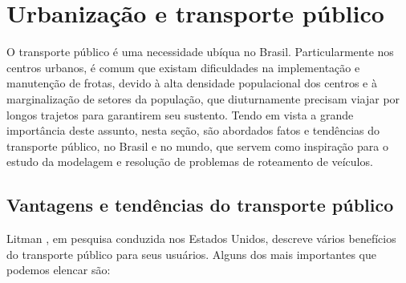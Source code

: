 \section{Urbanização e transporte público}\label{sec:urbanização e transporte público}
O transporte público é uma necessidade ubíqua no Brasil. Particularmente nos centros urbanos, é comum que existam dificuldades na implementação e manutenção de frotas, devido à alta densidade populacional dos centros e à marginalização de setores da população, que diuturnamente precisam viajar por longos trajetos para garantirem seu sustento. Tendo em vista a grande importância deste assunto, nesta seção, são abordados fatos e tendências do transporte público, no Brasil e no mundo, que servem como inspiração para o estudo da modelagem e resolução de problemas de roteamento de veículos.

\subsection{Vantagens e tendências do transporte público}\label{sec:vantagens transporte público}

Litman \cite{LITMAN:12}, em pesquisa conduzida nos Estados Unidos, descreve vários benefícios do transporte público para seus usuários. Alguns dos mais importantes que podemos elencar são:

